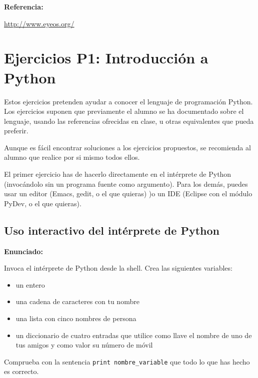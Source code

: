 \textbf{Referencia:}

\url{http://www.eyeos.org/}

\section{Ejercicios P1: Introducción a Python}

Estos ejercicios pretenden ayudar a conocer el lenguaje de programación Python. Los ejercicios suponen que previamente el alumno se ha documentado sobre el lenguaje, usando las referencias ofrecidas en clase, u otras equivalentes que pueda preferir.

Aunque es fácil encontrar soluciones a los ejercicios propuestos, se recomienda al alumno que realice por si mismo todos ellos.

El primer ejercicio has de hacerlo directamente en el intérprete de Python (invocándolo sin un  programa fuente como argumento). Para los demás, puedes usar un editor (Emacs, gedit, o el que quieras) )o un IDE (Eclipse con el módulo PyDev, o el que quieras).

\subsection{Uso interactivo del intérprete de Python}
\label{subsec:practicas-interprete}

\textbf{Enunciado:}

Invoca el intérprete de Python desde la shell. Crea las siguientes
variables:

\begin{itemize}
\item un entero
\item una cadena de caracteres con tu nombre
\item una lista con cinco nombres de persona
\item un diccionario de cuatro
entradas que utilice como llave el nombre de uno de tus amigos y como valor su
número de móvil
\end{itemize}

Comprueba con la sentencia \verb|print nombre_variable| que todo lo
que has hecho es correcto.

